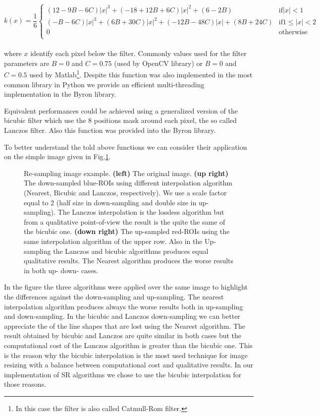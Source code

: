 \documentclass{standalone}
\begin{document}
$$
k(x) = \frac{1}{6} \left\{ \begin{array}{rc}
  (12 - 9B - 6C) |x|^3 + (-18 + 12B + 6C) |x|^2 + (6 - 2B)           & \mbox{if}        |x| < 1 \\
  (−B − 6C) |x|^3 + (6B + 30C) |x|^2 + (−12B − 48C) |x| + (8B + 24C) & \mbox{if} 1 \leq |x| < 2 \\
  0                                                                  & \mbox{otherwise}         \\
  \end{array}
  \right.
$$
\\
where $x$ identify each pixel below the filter.
Commonly values used for the filter parameters are $B=0$ and $C=0.75$ (used by \textsf{OpenCV} library) or $B=0$ and $C=0.5$ used by \textsf{Matlab}\footnote{
  In this case the filter is also called Catmull-Rom filter.
}.
Despite this function was also implemented in the most common library in \textsf{Python} we provide an efficient multi-threading implementation in the \textsf{Byron} library.

Equivalent performances could be achieved using a generalized version of the bicubic filter which use the 8 positions mask around each pixel, the so called Lanczos filter.
Also this function was provided into the \textsf{Byron} library.

To better understand the told above functions we can consider their application on the simple image given in Fig.\ref{fig:resampling}.

\begin{figure}[htbp]
\centering
\def\svgwidth{\textwidth}

\caption{Re-sampling image example.
\textbf{(left)} The original image.
\textbf{(up right)} The down-sampled blue-ROIs using different interpolation algorithm (Nearest, Bicubic and Lanczos, respectively).
We use a scale factor equal to 2 (half size in down-sampling and double size in up-sampling).
The Lanczos interpolation is the lossless algorithm but from a qualitative point-of-view the result is the quite the same of the bicubic one.
\textbf{(down right)} The up-sampled red-ROIs using the same interpolation algorithm of the upper row.
Also in the Up-sampling the Lanczos and bicubic algorithms produces equal qualitative results.
The Nearest algorithm produces the worse results in both up- down- cases.
}
\label{fig:resampling}
\end{figure}

In the figure the three algorithms were applied over the same image to highlight the differences against the down-sampling and up-sampling.
The nearest interpolation algorithm produces always the worse results both in up-sampling and down-sampling.
In the bicubic and Lanczos down-sampling we can better appreciate the  of the line shapes that are lost using the Nearest algorithm.
The result obtained by bicubic and Lanczos are quite similar in both cases but the computational cost of the Lanczos algorithm is greater than the bicubic one.
This is the reason why the bicubic interpolation is the most used technique for image resizing with a balance between computational cost and qualitative results.
In our implementation of SR algorithms we chose to use the bicubic interpolation for those reasons.
\end{document}
